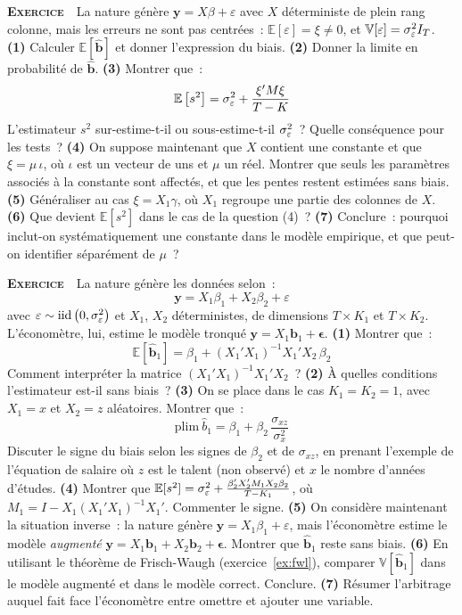 \documentclass[10pt,a4paper,notitlepage]{article}
\newcounter{xnumber}
\newcommand{\exercice}{\refstepcounter{xnumber}\textsc{\textbf{Exercice}} \textbf{\thexnumber}\,\,}
\newcommand{\question}[1]{\textbf{(#1)}}
\begin{document}
\exercice\label{ex:erreurs-non-centrees} La nature génère $\mathbf y = X\beta + \varepsilon$ avec $X$
déterministe de plein rang colonne, mais les erreurs ne sont pas centrées~:
$\mathbb E[\varepsilon] = \xi \neq 0$, et
$\mathbb V[\varepsilon] = \sigma_{\varepsilon}^2 I_T$. \question{1} Calculer
$\mathbb E[\hat{\mathbf b}]$ et donner l'expression du biais. \question{2}
Donner la limite en probabilité de $\hat{\mathbf b}$. \question{3} Montrer
que~:
\[
  \mathbb E\left[s^2\right] = \sigma_{\varepsilon}^2 + \frac{\xi'M\xi}{T-K}
\]
L'estimateur $s^2$ sur-estime-t-il ou sous-estime-t-il $\sigma_{\varepsilon}^2$~? Quelle
conséquence pour les tests~? \question{4} On suppose maintenant que $X$ contient
une constante et que $\xi = \mu\,\iota$, où $\iota$ est un vecteur de uns et
$\mu$ un réel. Montrer que seuls les paramètres associés à la constante sont
affectés, et que les pentes restent estimées sans biais. \question{5} Généraliser
au cas $\xi = X_1\gamma$, où $X_1$ regroupe une partie des colonnes de $X$.
\question{6} Que devient $\mathbb E[s^2]$ dans le cas de la question (4)~?
\question{7} Conclure~: pourquoi inclut-on systématiquement une constante dans
le modèle empirique, et que peut-on identifier séparément de $\mu$~?\newline

\bigskip

\exercice\label{ex:variable-omise} La nature génère les données selon~:
\[
  \mathbf y = X_1\beta_1 + X_2\beta_2 + \varepsilon
\]
avec $\varepsilon\sim\mathrm{iid}\left(0,\sigma_{\varepsilon}^2\right)$ et $X_1$, $X_2$ déterministes, de
dimensions $T\times K_1$ et $T\times K_2$. L'économètre, lui, estime le modèle
tronqué $\mathbf y = X_1\mathbf b_1 + \bm\epsilon$. \question{1} Montrer que~:
\[
  \mathbb E\left[\hat{\mathbf b}_1\right] = \beta_1 + (X_1'X_1)^{-1}X_1'X_2\,\beta_2
\]
Comment interpréter la matrice $(X_1'X_1)^{-1}X_1'X_2$~? \question{2} À quelles
conditions l'estimateur est-il sans biais~? \question{3} On se place dans le cas
$K_1 = K_2 = 1$, avec $X_1 = x$ et $X_2 = z$ aléatoires. Montrer que~:
\[
  \mathrm{plim}\ \hat b_1 = \beta_1 + \beta_2\,\frac{\sigma_{xz}}{\sigma_x^2}
\]
Discuter le signe du biais selon les signes de $\beta_2$ et de $\sigma_{xz}$, en
prenant l'exemple de l'équation de salaire où $z$ est le talent (non observé) et
$x$ le nombre d'années d'études. \question{4} Montrer que
$\mathbb E[s^2] = \sigma_{\varepsilon}^2 + \frac{\beta_2'X_2'M_1X_2\beta_2}{T-K_1}$, où
$M_1 = I-X_1(X_1'X_1)^{-1}X_1'$. Commenter le signe. \question{5} On considère
maintenant la situation inverse~: la nature génère
$\mathbf y = X_1\beta_1 + \varepsilon$, mais l'économètre estime le modèle
\emph{augmenté} $\mathbf y = X_1\mathbf b_1 + X_2\mathbf b_2 + \bm\epsilon$.
Montrer que $\hat{\mathbf b}_1$ reste sans biais. \question{6} En utilisant le
théorème de Frisch-Waugh (exercice~\ref{ex:fwl}), comparer
$\mathbb V[\hat{\mathbf b}_1]$ dans le modèle augmenté et dans le modèle
correct. Conclure. \question{7} Résumer l'arbitrage auquel fait face
l'économètre entre omettre et ajouter une variable.\newline
\end{document}
